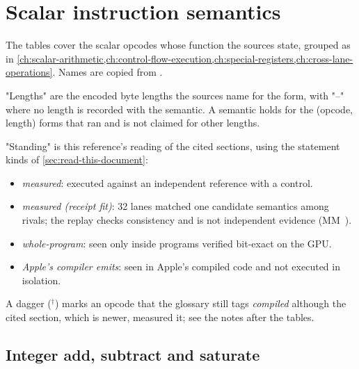 \chapter{Scalar instruction semantics}\label{app:b}

The tables cover the scalar opcodes whose function the sources state, grouped as in \cref{ch:scalar-arithmetic,ch:control-flow-execution,ch:special-registers,ch:cross-lane-operations}. Names are copied from .

"Lengths" are the encoded byte lengths the sources name for the form, with "–" where no length is recorded with the semantic. A semantic holds for the (opcode, length) forms that ran and is not claimed for other lengths.

"Standing" is this reference's reading of the cited sections, using the statement kinds of \cref{sec:read-this-document}:
\begin{itemize}
\item \emph{measured}: executed against an independent reference with a control.
\item \emph{measured (receipt fit)}: 32 lanes matched one candidate semantics among rivals; the replay checks consistency and is not independent evidence (MM~).
\item \emph{whole-program}: seen only inside programs verified bit-exact on the GPU.
\item \emph{Apple's compiler emits}: seen in Apple's compiled code and not executed in isolation.
\end{itemize}
A dagger ($^\dagger$) marks an opcode that the glossary still tags \emph{compiled} although the cited section, which is newer, measured it; see the notes after the tables.

\section{Integer add, subtract and saturate}\label{sec:integer-add-subtract}

